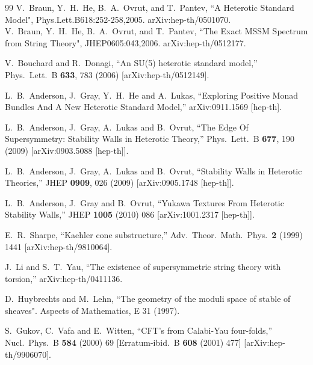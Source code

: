 \documentclass[12pt]{article}
\numberwithin{equation}{section}
\begin{document}
\begin{thebibliography}{99}
V.~Braun, Y.~H.~He, B.~A.~Ovrut, and T.~Pantev,
``A Heterotic Standard Model",
Phys.Lett.B618:252-258,2005. arXiv:hep-th/0501070. \\
V.~Braun, Y.~H.~He, B.~A.~Ovrut, and T.~Pantev,
``The Exact MSSM Spectrum from String Theory",
JHEP0605:043,2006. arXiv:hep-th/0512177.

  V.~Bouchard and R.~Donagi,
  ``An SU(5) heterotic standard model,''
  Phys.\ Lett.\  B {\bf 633}, 783 (2006)
  [arXiv:hep-th/0512149].

  L.~B.~Anderson, J.~Gray, Y.~H.~He and A.~Lukas,
  ``Exploring Positive Monad Bundles And A New Heterotic Standard Model,''
  arXiv:0911.1569 [hep-th].

  L.~B.~Anderson, J.~Gray, A.~Lukas and B.~Ovrut,
  ``The Edge Of Supersymmetry: Stability Walls in Heterotic Theory,''
  Phys.\ Lett.\  B {\bf 677}, 190 (2009)
  [arXiv:0903.5088 [hep-th]].

  L.~B.~Anderson, J.~Gray, A.~Lukas and B.~Ovrut,
  ``Stability Walls in Heterotic Theories,''
  JHEP {\bf 0909}, 026 (2009)
  [arXiv:0905.1748 [hep-th]].
 
  L.~B.~Anderson, J.~Gray and B.~Ovrut,
  ``Yukawa Textures From Heterotic Stability Walls,''
  JHEP {\bf 1005} (2010) 086
  [arXiv:1001.2317 [hep-th]].
 
  E.~R.~Sharpe,
  ``Kaehler cone substructure,''
  Adv.\ Theor.\ Math.\ Phys.\  {\bf 2} (1999) 1441
  [arXiv:hep-th/9810064].
 
  J.~Li and S.~T.~Yau,
  ``The existence of supersymmetric string theory with torsion,''
  arXiv:hep-th/0411136.
  
 D.~Huybrechts and M.~Lehn, ``The geometry of the moduli space of stable of sheaves". Aspects of Mathematics, E 31 (1997).

  S.~Gukov, C.~Vafa and E.~Witten,
  ``CFT's from Calabi-Yau four-folds,''
  Nucl.\ Phys.\  B {\bf 584} (2000) 69
  [Erratum-ibid.\  B {\bf 608} (2001) 477]
  [arXiv:hep-th/9906070].
  

\end{thebibliography}
\end{document}
